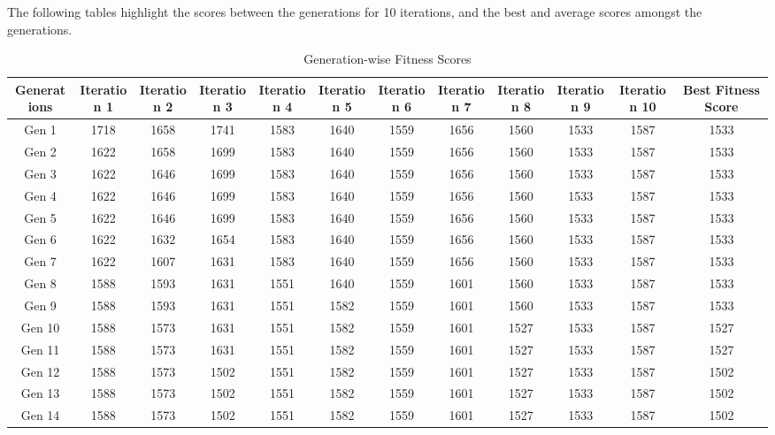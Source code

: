 \documentclass[12pt]{article}
\begin{document}
The following tables highlight the scores between the generations for 10 iterations, and the best and average scores amongst the generations. 

\begin{table}[h]
    \centering
    \caption{Generation-wise Fitness Scores}
    \label{tab:fitness_scores}
    \begin{adjustbox}{max width=0.97\textwidth} %
        \begin{tabular}{*{12}{c}}
        \toprule
        Generations & Iteration 1 & Iteration 2 & Iteration 3 & Iteration 4 & Iteration 5 & Iteration 6 & Iteration 7 & Iteration 8 & Iteration 9 & Iteration 10 & Best Fitness Score \\
        \midrule
        Gen 1 & 1718 & 1658 & 1741 & 1583 & 1640 & 1559 & 1656 & 1560 & 1533 & 1587 & 1533 \\
        Gen 2 & 1622 & 1658 & 1699 & 1583 & 1640 & 1559 & 1656 & 1560 & 1533 & 1587 & 1533 \\
        Gen 3 & 1622 & 1646 & 1699 & 1583 & 1640 & 1559 & 1656 & 1560 & 1533 & 1587 & 1533 \\
        Gen 4 & 1622 & 1646 & 1699 & 1583 & 1640 & 1559 & 1656 & 1560 & 1533 & 1587 & 1533 \\
        Gen 5 & 1622 & 1646 & 1699 & 1583 & 1640 & 1559 & 1656 & 1560 & 1533 & 1587 & 1533 \\
        Gen 6 & 1622 & 1632 & 1654 & 1583 & 1640 & 1559 & 1656 & 1560 & 1533 & 1587 & 1533 \\
        Gen 7 & 1622 & 1607 & 1631 & 1583 & 1640 & 1559 & 1656 & 1560 & 1533 & 1587 & 1533 \\
        Gen 8 & 1588 & 1593 & 1631 & 1551 & 1640 & 1559 & 1601 & 1560 & 1533 & 1587 & 1533 \\
        Gen 9 & 1588 & 1593 & 1631 & 1551 & 1582 & 1559 & 1601 & 1560 & 1533 & 1587 & 1533 \\
        Gen 10 & 1588 & 1573 & 1631 & 1551 & 1582 & 1559 & 1601 & 1527 & 1533 & 1587 & 1527 \\
        Gen 11 & 1588 & 1573 & 1631 & 1551 & 1582 & 1559 & 1601 & 1527 & 1533 & 1587 & 1527 \\
        Gen 12 & 1588 & 1573 & 1502 & 1551 & 1582 & 1559 & 1601 & 1527 & 1533 & 1587 & 1502 \\
        Gen 13 & 1588 & 1573 & 1502 & 1551 & 1582 & 1559 & 1601 & 1527 & 1533 & 1587 & 1502 \\
        Gen 14 & 1588 & 1573 & 1502 & 1551 & 1582 & 1559 & 1601 & 1527 & 1533 & 1587 & 1502 \\

\end{tabular}
\end{adjustbox}
\end{table}
\end{document}
